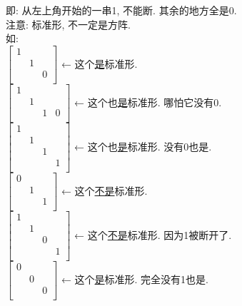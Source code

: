 \documentclass[UTF8]{ctexart}
\begin{document}
即: 从左上角开始的一串1, 不能断. 其余的地方全是0.\\
注意: 标准形, 不一定是方阵. \\

如: \\
$
\left[ \begin{matrix}
	1&		&		\\
	&		1&		\\
	&		&		0\\
\end{matrix} \right] 
$ ← 这个\underline{是}标准形. \\

$
\left[ \begin{matrix}
	1&		&		&		\\
	&		1&		&		\\
	&		&		1&		0\\
\end{matrix} \right] 
$ ← 这个也\underline{是}标准形. 哪怕它没有0. \\

$
\left[ \begin{matrix}
	1&		&		&		\\
	&		1&		&		\\
	&		&		1&		\\
	&		&		&		1\\
\end{matrix} \right] 
$ ← 这个也\underline{是}标准形. 没有0也是. \\

$
\left[ \begin{matrix}
	0&		&		\\
	&		1&		\\
	&		&		1\\
\end{matrix} \right] 
$ ← 这个\underline{不是}标准形.  \\

$
\left[ \begin{matrix}
	1&		&		&		\\
	&		1&		&		\\
	&		&		0&		\\
	&		&		&		1\\
\end{matrix} \right] 
$ ← 这个\underline{不是}标准形. 因为1被断开了. \\


$
\left[ \begin{matrix}
	0&		&		\\
	&		0&		\\
	&		&		0\\
\end{matrix} \right] 
$ ← 这个\underline{是}标准形. 完全没有1也是.\\
\end{document}
